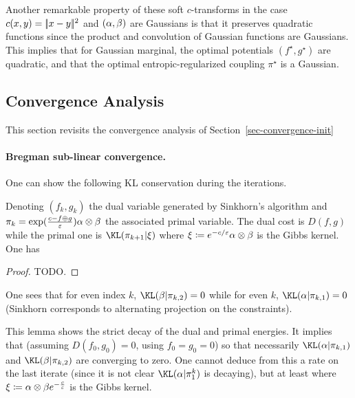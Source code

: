 \begin{rem}
	Another remarkable property of these soft $c$-transforms in the case $c(x,y)=|\!| x-y |\!|^2$ and $(\alpha,\beta)$ are Gaussians is that it preserves quadratic functions since the product and convolution of Gaussian functions are Gaussians.
	This implies that for Gaussian marginal, the optimal potentials $(f^\star,g^\star)$ are quadratic, and that the optimal entropic-regularized coupling $\pi^\star$ is a Gaussian.
\end{rem}
  

\subsection{Convergence Analysis}
\label{sec-convergence-dual}


This section revisits the convergence analysis of Section~\ref{sec-convergence-init}

\paragraph{Bregman sub-linear convergence.}

One can show the following KL conservation during the iterations.

\begin{proposition}
	Denoting $(f_k,g_k)$ the dual variable generated by Sinkhorn's algorithm and $\pi_k = \exp(\frac{c-f \oplus g}{\varepsilon}) \alpha \otimes \beta$ the associated primal variable. The dual cost is $D(f,g)$ while the primal one is
	$\KL(\pi_{k+1}|\xi)$ where $\xi \coloneqq e^{-c/\varepsilon} \alpha \otimes \beta$ is the Gibbs kernel. One has
\end{proposition}

\begin{proof}
	TODO. 
\end{proof}

One sees that for even index $k$, $\KL(\be|\pi_{k,2})=0$ while for even $k$, $\KL(\al|\pi_{k,1})=0$ (Sinkhorn corresponds to alternating projection on the constraints).

This lemma shows the strict decay of the dual and primal energies.
It implies that (assuming $D(f_0,g_0)=0$, using $f_0=g_0=0$)
so that necessarily $\KL(\al|\pi_{k,1})$ and $\KL(\be|\pi_{k,2})$ are converging to zero. One cannot deduce from this a rate on the last iterate (since it is not clear $\KL(\al|\pi_1^k)$ is decaying), but at least 
where $\xi \coloneqq \alpha\otimes\beta e^{-\frac{c}{\varepsilon}}$ is the Gibbs kernel.

